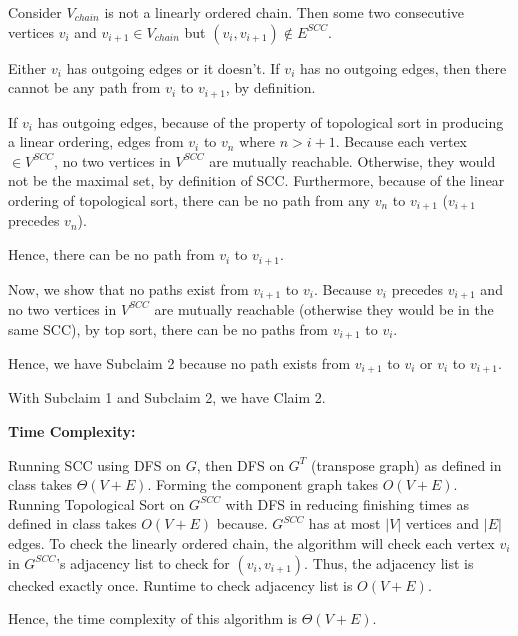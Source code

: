 \documentclass[a4paper]{report}
\begin{document}
\begin{enumerate}
      Consider $V_{chain}$ is not a linearly ordered chain. Then some two consecutive vertices $v_{i}$ and 
      $v_{i+1} \in V_{chain}$ but $(v_{i}, v_{i+1}) \not\in E^{SCC}$. 

      Either $v_{i}$ has outgoing edges or it doesn't. If $v_{i}$ has no outgoing edges, then there cannot be any path from
      $v_{i}$ to $v_{i+1}$, by definition. 

      If $v_{i}$ has outgoing edges, because of the property of topological sort in producing a linear ordering, edges from $v_{i}$ to 
      $v_{n}$ where $n > i+1$. Because each vertex $\in V^{SCC}$, no two vertices in $V^{SCC}$ are mutually reachable. Otherwise, 
      they would not be the maximal set, by definition of SCC. Furthermore, because of the linear ordering of topological sort, 
      there can be no path from any $v_{n}$ to $v_{i+1}$ ($v_{i+1}$ precedes $v_{n}$). 
      
      Hence, there can be no path from $v_{i}$ to $v_{i+1}$.

      Now, we show that no paths exist from $v_{i+1}$ to $v_{i}$.
      Because $v_{i}$ precedes $v_{i+1}$ and no two vertices in $V^{SCC}$ are mutually reachable (otherwise they would be in the same
      SCC), by top sort, there can be no paths from $v_{i+1}$ to $v_{i}$. 

      Hence, we have Subclaim 2 because no path exists from $v_{i+1}$ to $v_{i}$ or $v_{i}$ to $v_{i+1}$. 

      With Subclaim 1 and Subclaim 2, we have Claim 2. 


      {\bf Time Complexity:}
      
      Running SCC using DFS on $G$, then DFS on $G^{T}$ (transpose graph) as defined in class takes $\Theta(V+E)$.
      Forming the component graph takes $O(V+E)$. 
      Running Topological Sort on $G^{SCC}$ with DFS in reducing finishing times as defined in class takes $O(V+E)$ because.
      $G^{SCC}$ has at most $|V|$ vertices and $|E|$ edges. 
      To check the linearly ordered chain, the algorithm will check each vertex $v_{i}$ in $G^{SCC}$'s adjacency list to check for
      $(v_{i}, v_{i+1})$. Thus, the adjacency list is checked exactly once. Runtime to check adjacency list is $O(V+E)$.

      Hence, the time complexity of this algorithm is $\Theta(V+E)$.


    \par
    \pagebreak
    \bigskip
    \setcounter{equation}{0}


\end{enumerate}
\end{document}
